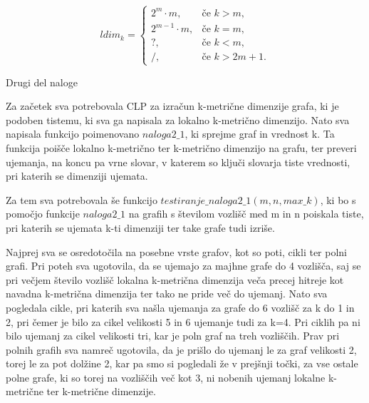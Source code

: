 \documentclass[12pt,a4paper]{amsart}
\makeatletter
\renewcommand\subsection{\@startsection{subsection}{2}%
  \z@{.5\linespacing\@plus.7\linespacing}{.5\linespacing}%
  {\normalfont\scshape}}
\theoremstyle{plain} %
\makeatother
\begin{document}
\begin{enumerate}
\begin{table}[h]
    
\end{table}



\begin{equation}
ldim_k =
\begin{cases}
  2^m \cdot m, & \text{če } k > m, \\
  2^{m-1} \cdot m, & \text{če } k = m,\\
  ?, & \text{če } k < m, \\
  /, & \text{če } k >2 m +1 . \nonumber
\end{cases}
\end{equation}


\end{enumerate}  



\bigskip


\subsection{Drugi del naloge}

Za začetek sva potrebovala CLP za izračun k-metrične dimenzije grafa, ki je podoben tistemu, 
ki sva ga napisala za lokalno k-metrično dimenzijo.  
Nato sva napisala funkcijo poimenovano $naloga2\_1$, ki sprejme graf in vrednost k. Ta funkcija poišče lokalno k-metrično ter k-metrično dimenzijo na grafu, ter preveri ujemanja, na koncu pa vrne slovar, v katerem so ključi slovarja tiste vrednosti, pri katerih se dimenziji ujemata.

Za tem sva potrebovala še funkcijo $testiranje\_naloga2\_1(m, n, max\_k)$, 
ki bo s pomočjo funkcije $naloga2\_1$ na grafih s številom vozlišč med m in n poiskala 
tiste, pri katerih se ujemata k-ti dimenziji ter take grafe tudi izriše.

Najprej sva se osredotočila na posebne vrste grafov, kot so poti, cikli ter polni grafi. 
Pri poteh sva ugotovila, da se ujemajo za majhne grafe do 4 vozlišča, saj se pri 
večjem število vozlišč lokalna k-metrična dimenzija veča precej hitreje kot navadna 
k-metrična dimenzija ter tako ne pride več do ujemanj. Nato sva pogledala cikle, pri 
katerih sva našla ujemanja za grafe do 6 vozlišč za k do 1 in 2, pri čemer je bilo za 
cikel velikosti 5 in 6 ujemanje tudi za k=4. Pri ciklih pa ni bilo ujemanj za cikel 
velikosti tri, kar je poln graf na treh vozliščih. Prav pri polnih grafih sva namreč 
ugotovila, da je prišlo do ujemanj le za graf velikosti 2, torej le za pot 
dolžine 2, kar pa smo si pogledali že v prejšnji točki, za vse ostale polne grafe, 
ki so torej na vozliščih več kot 3, ni nobenih ujemanj lokalne k-metrične ter 
k-metrične dimenzije.
\end{document}
